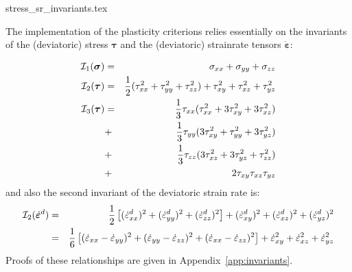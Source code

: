 \begin{flushright} {\tiny {\color{gray} stress\_sr\_invariants.tex}} \end{flushright}

The implementation of the plasticity criterions relies essentially 
on the invariants of the (deviatoric) stress ${\bm \tau}$ 
and the (deviatoric) strainrate tensors $\dot{\bm \varepsilon}$:

\begin{eqnarray}
{\cal I}_1({\bm \sigma}) &=& \sigma_{xx}+\sigma_{yy}+\sigma_{zz}\\
{\cal I}_2({\bm \tau})   
&=&\frac{1}{2}(\tau_{xx}^2 + \tau_{yy}^2 + \tau_{zz}^2 ) + \tau_{xy}^2 + \tau_{xz}^2 + \tau_{yz}^2  \\
{\cal I}_3({\bm \tau}) 
&=& \frac{1}{3} \tau_{xx} (  \tau_{xx}^2 + 3 \tau_{xy}^2 + 3 \tau_{xz}^2  )     \nonumber\\
&+& \frac{1}{3} \tau_{yy} (3 \tau_{xy}^2 +   \tau_{yy}^2 + 3 \tau_{yz}^2  )     \nonumber\\
&+& \frac{1}{3} \tau_{zz} (3 \tau_{xz}^2 + 3 \tau_{yz}^2 +   \tau_{zz}^2)       \nonumber\\
&+& 2 \tau_{xy} \tau_{xz} \tau_{yz}  
\end{eqnarray}
and also the second invariant of the deviatoric strain rate is:
\begin{eqnarray}
{\cal I}_2(\dot{\bm{\varepsilon}}^d)
&=& \frac{1}{2} \left[ (\dot{\varepsilon}_{xx}^d)^2 + (\dot{\varepsilon}_{yy}^d)^2 + (\dot{\varepsilon}_{zz}^d)^2   \right] 
+ (\dot{\varepsilon}_{xy}^d)^2  
+ (\dot{\varepsilon}_{xz}^d)^2  
+ (\dot{\varepsilon}_{yz}^d)^2  \nonumber\\
&=& \frac{1}{6} \left[ (\dot{\varepsilon}_{xx}-\dot{\varepsilon}_{yy})^2 
+ (\dot{\varepsilon}_{yy}-\dot{\varepsilon}_{zz})^2 
+ (\dot{\varepsilon}_{xx}-\dot{\varepsilon}_{zz})^2 \right] 
+ \dot{\varepsilon}_{xy}^2 + \dot{\varepsilon}_{xz}^2 + \dot{\varepsilon}_{yz}^2 \label{eq:I2epsd} 
\end{eqnarray}
Proofs of these relationships are given in Appendix~\ref{app:invariants}.

